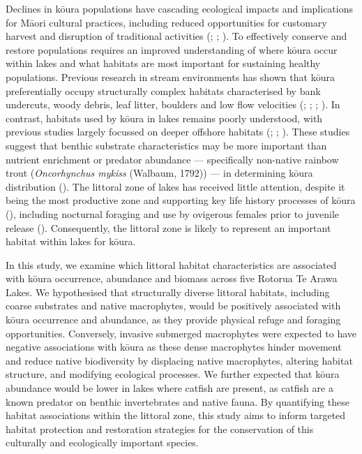 \documentclass[
  letterpaper,
  DIV=11,
  numbers=noendperiod]{scrartcl}
\begin{document}
Declines in kōura populations have cascading ecological impacts and
implications for Māori cultural practices, including reduced
opportunities for customary harvest and disruption of traditional
activities (;
;
). To effectively conserve
and restore populations requires an improved understanding of where
kōura occur within lakes and what habitats are most important for
sustaining healthy populations. Previous research in stream environments
has shown that kōura preferentially occupy structurally complex habitats
characterised by bank undercuts, woody debris, leaf litter, boulders and
low flow velocities (;
;
;
). In contrast, habitats
used by kōura in lakes remains poorly understood, with previous studies
largely focussed on deeper offshore habitats
(;
;
). These studies suggest
that benthic substrate characteristics may be more important than
nutrient enrichment or predator abundance --- specifically non-native
rainbow trout (\emph{Oncorhynchus mykiss} (Walbaum, 1792)) --- in
determining kōura distribution (). The littoral zone of lakes has received little attention,
despite it being the most productive zone and supporting key life
history processes of kōura (), including nocturnal foraging and use by ovigerous
females prior to juvenile release (). Consequently, the littoral zone is likely to represent an
important habitat within lakes for kōura.

In this study, we examine which littoral habitat characteristics are
associated with kōura occurrence, abundance and biomass across five
Rotorua Te Arawa Lakes. We hypothesised that structurally diverse
littoral habitats, including coarse substrates and native macrophytes,
would be positively associated with kōura occurrence and abundance, as
they provide physical refuge and foraging opportunities. Conversely,
invasive submerged macrophytes were expected to have negative
associations with kōura as these dense macrophytes hinder movement and
reduce native biodiversity by displacing native macrophytes, altering
habitat structure, and modifying ecological processes. We further
expected that kōura abundance would be lower in lakes where catfish are
present, as catfish are a known predator on benthic invertebrates and
native fauna. By quantifying these habitat associations within the
littoral zone, this study aims to inform targeted habitat protection and
restoration strategies for the conservation of this culturally and
ecologically important species.
\end{document}
